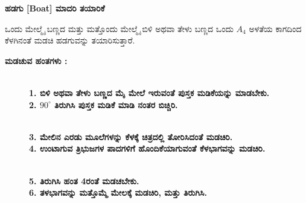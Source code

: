 \noindent
\textbf{ಹಡಗು [Boat] ಮಾದರಿ ತಯಾರಿಕೆ}

ಒಂದು ಮೇಲ್ಮೈ ಬಣ್ಣದ ಮತ್ತು ಮತ್ತೊಂದು ಮೇಲ್ಮೈ ಬಿಳಿ ಅಥವಾ ತೇಳು ಬಣ್ಣದ \hbox{ಒಂದು} $A_4$ ಅಳತೆಯ ಕಾಗದಿಂದ ಕೆಳಗಿನಂತೆ ಮಡಚಿ ಹಡಗುವನ್ನು ತಯಾರಿಸುತ್ತಾರೆ. 

\eject

\noindent
\textbf{ಮಡಚುವ ಹಂತಗಳು :}
\begin{figure}[H]
\\
\textbf{1. ಬಿಳಿ ಅಥವಾ ತೇಳು ಬಣ್ಣದ ಮೈ ಮೇಲೆ ಇರುವಂತೆ ಪುಸ್ತಕ ಮಡಿಕೆಯನ್ನು ಮಾಡಬೇಕು.}\\
\textbf{2. $90^{\circ}$ ತಿರುಗಿಸಿ ಪುಸ್ತಕ ಮಡಿಕೆ ಮಾಡಿ ನಂತರ ಬಿಚ್ಚಿರಿ.}
\end{figure}
 \begin{figure}[H]
\\
\textbf{3. ಮೇಲಿನ ಎರಡು ಮೂಲೆಗಳನ್ನು ಕೆಳಕ್ಕೆ ಚಿತ್ರದಲ್ಲಿ ತೋರಿಸಿದಂತೆ ಮಡಚಿರಿ.}\\
\textbf{4. ಉಂಟಾಗುವ ತ್ರಿಭುಜಗಳ ಪಾದಗಳಿಗೆ ಹೊಂದಿಕೆಯಾಗುವಂತೆ ಕೆಳಭಾಗವನ್ನು ಮಡಚಿರಿ.}
\end{figure}
\begin{figure}[H]
\\
\textbf{5. ತಿರುಗಿಸಿ ಹಂತ 4ರಂತೆ ಮಡಚಬೇಕು.}\\
\textbf{6. ತಳಭಾಗವನ್ನು ಮತ್ತೊಮ್ಮೆ ಮೇಲಕ್ಕೆ ಮಡಚಿರಿ, ಮತ್ತು ತಿರುಗಿಸಿ.}
\end{figure}
